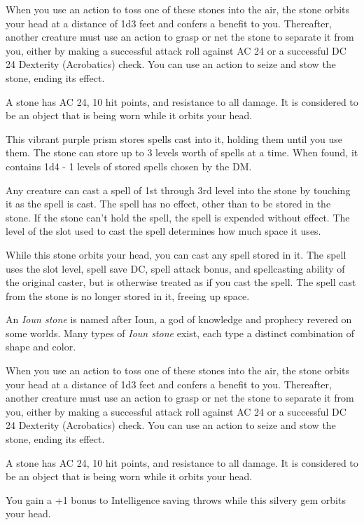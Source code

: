 \documentclass[10pt,a4paper,twoside,bg=print,twocolumn,openany,nodeprecatedcode]{dndbook}
\begin{document}
When you use an action to toss one of these stones into the air, the stone orbits your head at a distance of 1d3 feet and confers a benefit to you. Thereafter, another creature must use an action to grasp or net the stone to separate it from you, either by making a successful attack roll against AC 24 or a successful DC 24 Dexterity (Acrobatics) check. You can use an action to seize and stow the stone, ending its effect.

A stone has AC 24, 10 hit points, and resistance to all damage. It is considered to be an object that is being worn while it orbits your head.

This vibrant purple prism stores spells cast into it, holding them until you use them. The stone can store up to 3 levels worth of spells at a time. When found, it contains 1d4 - 1 levels of stored spells chosen by the DM.

Any creature can cast a spell of 1st through 3rd level into the stone by touching it as the spell is cast. The spell has no effect, other than to be stored in the stone. If the stone can't hold the spell, the spell is expended without effect. The level of the slot used to cast the spell determines how much space it uses.

While this stone orbits your head, you can cast any spell stored in it. The spell uses the slot level, spell save DC, spell attack bonus, and spellcasting ability of the original caster, but is otherwise treated as if you cast the spell. The spell cast from the stone is no longer stored in it, freeing up space.

An \textit{Ioun stone} is named after Ioun, a god of knowledge and prophecy revered on some worlds. Many types of \textit{Ioun stone} exist, each type a distinct combination of shape and color.

When you use an action to toss one of these stones into the air, the stone orbits your head at a distance of 1d3 feet and confers a benefit to you. Thereafter, another creature must use an action to grasp or net the stone to separate it from you, either by making a successful attack roll against AC 24 or a successful DC 24 Dexterity (Acrobatics) check. You can use an action to seize and stow the stone, ending its effect.

A stone has AC 24, 10 hit points, and resistance to all damage. It is considered to be an object that is being worn while it orbits your head.

You gain a +1 bonus to Intelligence saving throws while this silvery gem orbits your head.
\end{document}
